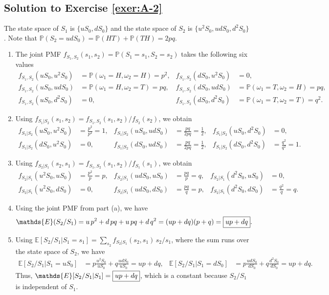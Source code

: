 \documentclass[12pt]{book}
\numberwithin{equation}{chapter}
\theoremstyle{plain}
\numberwithin{theorem}{section}
\theoremstyle{definition}
\numberwithin{exercise}{chapter}
\newcommand{\<}{\langle}
\renewcommand{\>}{\rangle}
\renewcommand{\(}{\left(}
\renewcommand{\)}{\right)}
\renewcommand{\[}{\left[}
\renewcommand{\]}{\right]}
\newcommand\Eb{\mathds{E}}
\newcommand\Pb{\mathds{P}}
\newcommand\om{\omega}
\theoremstyle{definition}
\numberwithin{question}{section}
\begin{document}
\subsection*{Solution to Exercise \ref{exer:A-2}}
The state space of $S_1$ is $\{ u S_0, d S_0 \}$ and the state space of $S_2$ is $\{ u^2 S_0, u d S_0, d^2 S_0 \}$.  Note that $\Pb(S_2 = u d S_0) = \Pb(HT) + \Pb(TH) = 2pq$.
\begin{enumerate}
\item The joint PMF $f_{S_1,S_2}(s_1,s_2) = \Pb(S_1 = s_1, S_2 = s_2)$ takes the following six values
\begin{align}
f_{S_1,S_2}(uS_0,u^2S_0) &= \Pb(\om_1 = H, \om_2 = H) = p^2 , &
f_{S_1,S_2}(dS_0,u^2S_0) &= 0 , \\
f_{S_1,S_2}(uS_0,udS_0) &= \Pb(\om_1 = H, \om_2 = T) = pq , &
f_{S_1,S_2}(dS_0,udS_0) &= \Pb(\om_1 = T, \om_2 = H) = pq , \\
f_{S_1,S_2}(uS_0,d^2S_0) &= 0 , &
f_{S_1,S_2}(dS_0,d^2S_0) &= \Pb(\om_1 = T, \om_2 = T) = q^2 .
\end{align}
\item Using $f_{S_1|S_2}(s_1,s_2) = f_{S_1,S_2}(s_1,s_2) / f_{S_2}(s_2)$, we obtain
\begin{align}
f_{S_1|S_2}(uS_0,u^2S_0) &= \frac{p^2}{p^2} = 1 , &
f_{S_1|S_2}(uS_0,udS_0) &= \frac{pq}{2pq} = \frac{1}{2} , &
f_{S_1|S_2}(uS_0,d^2S_0) &= 0 , \\
f_{S_1|S_2}(dS_0,u^2S_0) &= 0 , &
f_{S_1|S_2}(dS_0,udS_0) &= \frac{pq}{2pq} = \frac{1}{2} , &
f_{S_1|S_2}(dS_0,d^2S_0) &= \frac{q^2}{q^2} = 1 .
\end{align}
\item Using $f_{S_2|S_1}(s_2,s_1) = f_{S_1,S_2}(s_1,s_2) / f_{S_1}(s_1)$, we obtain
\begin{align}
f_{S_2|S_1}(u^2S_0,uS_0) &= \frac{p^2}{p} = p , &
f_{S_2|S_1}(udS_0,uS_0) &= \frac{pq}{p} = q , &
f_{S_2|S_1}(d^2S_0,uS_0) &= 0 , \\
f_{S_2|S_1}(u^2S_0,dS_0) &= 0 , &
f_{S_2|S_1}(udS_0,dS_0) &= \frac{pq}{q} = p , &
f_{S_2|S_1}(d^2S_0,dS_0) &= \frac{q^2}{q} = q .
\end{align}
\item Using the joint PMF from part (a), we have
\begin{align}
\Eb(S_2/S_1)
	&=	u \, p^2 + d \, pq + u \, pq + d \, q^2
	=		(up + dq)(p + q)
	=		\fbox{$up + dq$} .
\end{align}
\item Using $\Eb[S_2/S_1 | S_1 = s_1] = \sum_{s_2} f_{S_2|S_1}(s_2,s_1) \, s_2/s_1$, where the sum runs over the state space of $S_2$, we have
\begin{align}
\Eb[S_2/S_1|S_1 = uS_0]
	&=	p \frac{u^2S_0}{uS_0} + q \frac{udS_0}{uS_0}
	=		up + dq , &
\Eb[S_2/S_1|S_1 = dS_0]
	&=	p \frac{udS_0}{dS_0} + q \frac{d^2S_0}{dS_0}
	=		up + dq .
\end{align}
Thus, $\Eb[S_2/S_1 | S_1] = \fbox{$up + dq$}$, which is a constant because $S_2/S_1$ is independent of $S_1$.
\end{enumerate}
\end{document}
